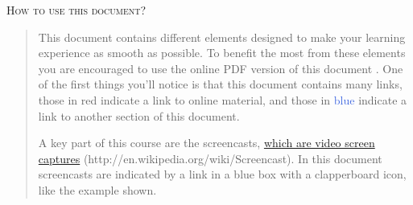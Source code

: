 \textsc{How to use this document?}
\begin{quote}
This document contains different elements designed to make your learning experience as smooth as possible. To benefit the most from these elements you are encouraged to use the online PDF version of this document . One of the first things you'll notice is that this document contains many links, those in \textcolor{webbrown}{red} indicate a link to online material, and those in \textcolor{RoyalBlue}{blue} indicate a link to another section of this document. 

A key part of this course are the screencasts, \href{http://en.wikipedia.org/wiki/Screencast}{which are video screen captures} (http://en.wikipedia.org/wiki/Screencast). In this document screencasts are indicated by a link in a blue box with a clapperboard icon, like the example shown. 
\end{quote}
\addtolength{\parindent}{-4mm}
\\
\addtolength{\parindent}{4mm}

